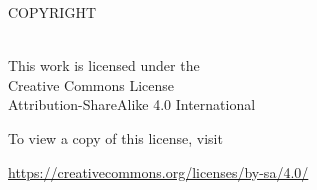 \documentclass[10pt]{report}
\begin{document}

\doublespacing

\thispagestyle{empty} %
\setcounter{page}{2}

\vspace*{\fill}

\begin{flushleft}
\mytitle

COPYRIGHT

\myyear

\myauthorfull\\[24 pt] %

This work is licensed under the \\
Creative Commons License \\
Attribution-ShareAlike 4.0 International

To view a copy of this license, visit

\url{https://creativecommons.org/licenses/by-sa/4.0/}

\end{flushleft}
\pagebreak
\end{document}

